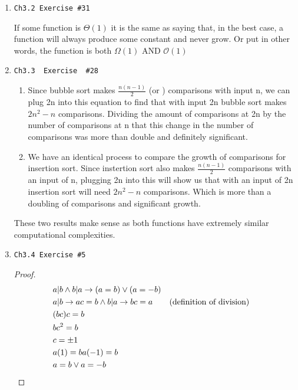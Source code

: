 \documentclass[12pt]{article}
\begin{document}
\begin{enumerate}
    \item \begin{verbatim}Ch3.2 Exercise #31\end{verbatim}
        If some function is $ \Theta(1) $ it is the same as saying that, in the best case, a function
        will always produce some constant and never grow. Or put in other words, the function is both
        $ \Omega(1) $ AND $ \mathcal{O}(1) $
    \item \begin{verbatim}Ch3.3  Exercise  #28 \end{verbatim}
        \begin{enumerate}[label=\roman*]
            \item Since bubble sort makes $ \frac{n(n-1)}{2} $ (or ) comparisons with input n, we can plug 2n into this equation
            to find that with input 2n bubble sort makes $ 2n^2 - n $ comparisons. Dividing the amount of comparisons at 2n by
            the number of comparisons at n that this change in the number of comparisons was more than double and definitely
            significant.

            \item We have an identical process to compare the growth of comparisons for insertion sort. Since instertion sort
            also makes $ \frac{n(n-1)}{2} $ comparisons with an input of n, plugging 2n into this will show us that with an
            input of 2n insertion sort will need $ 2n^2 -n $ comparisons. Which is more than a doubling of comparisons and
            significant growth.
        \end{enumerate}
        These two results make sense as both functions have extremely similar computational complexities.
    \item \begin{verbatim}Ch3.4 Exercise #5 \end{verbatim}
        \begin{proof}
            \begin{align*}
                & a | b \wedge b | a \rightarrow (a = b) \vee (a = -b)  \\
                & a | b \rightarrow ac = b \wedge b | a \rightarrow bc = a && \text{(definition of division)} \\
                &  (bc)c = b  \\
                &  bc^2 = b \\
                &  c = \pm1  \\
                &  a(1) = b a(-1) = b  \\
                &  a = b \vee a = -b  \qedhere 
            \end{align*}
        \end{proof}


\end{enumerate}
\end{document}
